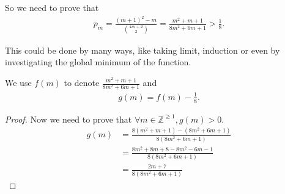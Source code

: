 \begin{solution}
    So we need to prove that 
    \begin{align*}
        p_m = \frac{(m+1)^2-m}{\binom{4m+2}{2}} = \frac{m^2+m+1}{8m^2+6m+1} > \frac{1}{8}.
    \end{align*}
    
    This could be done by many ways, like taking limit, induction or even by investigating the global minimum of the function.
    
    We use $f(m)$ to denote $\frac{m^2+m+1}{8m^2+6m+1}$ and
    \begin{align*}
        g(m) = f(m) - \frac{1}{8}.
    \end{align*}
    
    \begin{proof}
    Now we need to prove that $\forall m \in \mathbb{Z}^{\geq 1}, g(m) > 0$.
        \begin{align}
            g(m) &= \frac{8\left(m^2+m+1\right)-\left(8 m^2+6 m+1\right)}{8\left(8 m^2+6 m+1\right)} \\
            &= \frac{8 m^2+8 m+8-8 m^2-6 m-1}{8\left(8 m^2+6 m+1\right)} \\
            &= \frac{2 m+7}{8\left(8 m^2+6 m+1\right)}
        \end{align}
    \end{proof}

    
\end{solution}


    


















